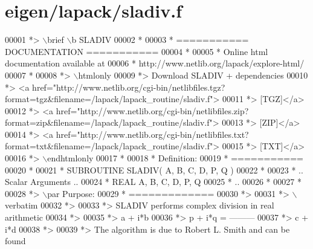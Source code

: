 \hypertarget{eigen_2lapack_2sladiv_8f_source}{}\section{eigen/lapack/sladiv.f}
\label{eigen_2lapack_2sladiv_8f_source}

\begin{DoxyCode}
00001 \textcolor{comment}{*> \(\backslash\)brief \(\backslash\)b SLADIV}
00002 \textcolor{comment}{*}
00003 \textcolor{comment}{*  =========== DOCUMENTATION ===========}
00004 \textcolor{comment}{*}
00005 \textcolor{comment}{* Online html documentation available at }
00006 \textcolor{comment}{*            http://www.netlib.org/lapack/explore-html/ }
00007 \textcolor{comment}{*}
00008 \textcolor{comment}{*> \(\backslash\)htmlonly}
00009 \textcolor{comment}{*> Download SLADIV + dependencies }
00010 \textcolor{comment}{*> <a
       href="http://www.netlib.org/cgi-bin/netlibfiles.tgz?format=tgz&filename=/lapack/lapack\_routine/sladiv.f"> }
00011 \textcolor{comment}{*> [TGZ]</a> }
00012 \textcolor{comment}{*> <a
       href="http://www.netlib.org/cgi-bin/netlibfiles.zip?format=zip&filename=/lapack/lapack\_routine/sladiv.f"> }
00013 \textcolor{comment}{*> [ZIP]</a> }
00014 \textcolor{comment}{*> <a
       href="http://www.netlib.org/cgi-bin/netlibfiles.txt?format=txt&filename=/lapack/lapack\_routine/sladiv.f"> }
00015 \textcolor{comment}{*> [TXT]</a>}
00016 \textcolor{comment}{*> \(\backslash\)endhtmlonly }
00017 \textcolor{comment}{*}
00018 \textcolor{comment}{*  Definition:}
00019 \textcolor{comment}{*  ===========}
00020 \textcolor{comment}{*}
00021 \textcolor{comment}{*       SUBROUTINE SLADIV( A, B, C, D, P, Q )}
00022 \textcolor{comment}{* }
00023 \textcolor{comment}{*       .. Scalar Arguments ..}
00024 \textcolor{comment}{*       REAL               A, B, C, D, P, Q}
00025 \textcolor{comment}{*       ..}
00026 \textcolor{comment}{*  }
00027 \textcolor{comment}{*}
00028 \textcolor{comment}{*> \(\backslash\)par Purpose:}
00029 \textcolor{comment}{*  =============}
00030 \textcolor{comment}{*>}
00031 \textcolor{comment}{*> \(\backslash\)verbatim}
00032 \textcolor{comment}{*>}
00033 \textcolor{comment}{*> SLADIV performs complex division in  real arithmetic}
00034 \textcolor{comment}{*>}
00035 \textcolor{comment}{*>                       a + i*b}
00036 \textcolor{comment}{*>            p + i*q = ---------}
00037 \textcolor{comment}{*>                       c + i*d}
00038 \textcolor{comment}{*>}
00039 \textcolor{comment}{*> The algorithm is due to Robert L. Smith and can be found}

\end{DoxyCode}
